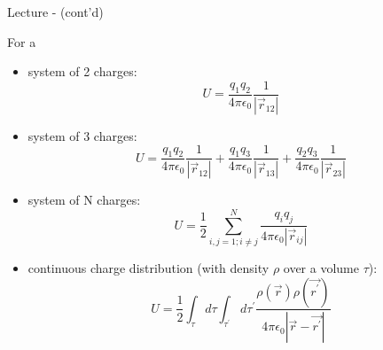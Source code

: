 \begin{frame}{Lecture \summarizedlecture - \lecturesummarytitle (cont'd)}

For a
\begin{itemize}
\item system of 2 charges:
 \begin{equation*}
      U = \frac{q_1 q_2}{4\pi\epsilon_0} \frac{1}{|\vec{r}_{12}|}
 \end{equation*}

\item system of 3 charges:
 \begin{equation*}
   U = \frac{q_1 q_2}{4\pi\epsilon_0} \frac{1}{|\vec{r}_{12}|} +
       \frac{q_1 q_3}{4\pi\epsilon_0} \frac{1}{|\vec{r}_{13}|} +
       \frac{q_2 q_3}{4\pi\epsilon_0} \frac{1}{|\vec{r}_{23}|}
 \end{equation*}

\item system of N charges:
 \begin{equation*}
   U = \frac{1}{2} \sum_{i,j=1;i{\ne}j}^{N} \frac{q_i q_j}{4\pi\epsilon_0|\vec{r}_{ij}|}
 \end{equation*}

\item continuous charge distribution (with density $\rho$ over a volume $\tau$):
 \begin{equation*}
    U = \frac{1}{2} \int_{\tau} d\tau \int_{\tau^{\prime}} d\tau^{\prime}
        \frac{\rho(\vec{r}) \rho(\vec{r^{\prime}})}{4\pi\epsilon_0|\vec{r} - \vec{r^{\prime}}|}
 \end{equation*}

\end{itemize}

\end{frame}

%
%
%

